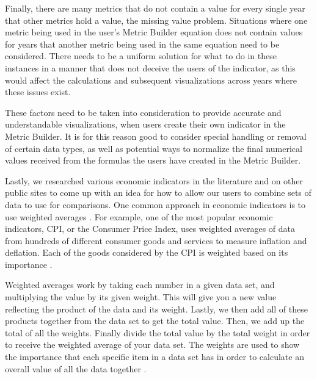 		Finally, there are many metrics that do not contain a value for every 
		single year that other metrics hold a value, the missing value problem. 
		Situations where one metric being used in the user's Metric Builder 
		equation does not contain values for years that another metric being 
		used in the same equation need to be considered. There needs to be a 
		uniform solution for what to do in these instances in a manner that does 
		not deceive the users of the indicator, as this would affect the 
		calculations and subsequent visualizations across years where these 
		issues exist.

		These factors need to be taken into consideration to provide accurate 
		and understandable visualizations, when users create their own indicator 
		in the Metric Builder. It is for this reason good to consider special 
		handling or removal of certain data types, as well as potential ways to 
		normalize the final numerical values received from the formulas the 
		users have created in the Metric Builder.

		Lastly, we researched various economic indicators in the literature and 
		on other public sites to come up with an idea for how to allow our users 
		to combine sets of data to use for comparisons. One common approach in 
		economic indicators is to use weighted averages \cite{weightedaverage}. 
		For example, one of the most popular economic indicators, CPI, or the 
		Consumer Price Index, uses weighted averages of data from hundreds of 
		different consumer goods and services to measure inflation and 
		deflation. Each of the goods considered by the CPI is weighted based on 
		its importance \cite{cpi}.

		Weighted averages work by taking each number in a given data set, and 
		multiplying the value by its given weight. This will give you a new 
		value reflecting the product of the data and its weight. Lastly, we then 
		add all of these products together from the data set to get the total 
		value. Then, we add up the total of all the weights. Finally divide the 
		total value by the total weight in order to receive the weighted average 
		of your data set. The weights are used to show the importance that each 
		specific item in a data set has in order to calculate an overall value 
		of all the data together \cite{economic}.
